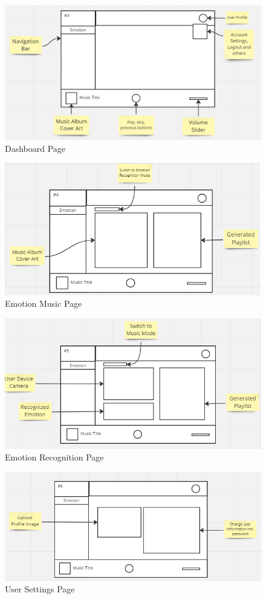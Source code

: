\begin{figure}[!ht]
    \centering
    \includegraphics[width=12cm]{Images/overview.png}
    \caption{Dashboard Page}
    \label{fig:dashboard}
\end{figure}
\begin{figure}[!ht]
    \centering
    \includegraphics[width=12cm]{Images/emotion.png}
    \caption{Emotion Music Page}
    \label{fig:emotion}
\end{figure}
\begin{figure}[!ht]
    \centering
    \includegraphics[width=12cm]{Images/detection.png}
    \caption{Emotion Recognition Page}
    \label{fig:emotion-recog}
\end{figure}
\begin{figure}[!ht]
    \centering
    \includegraphics[width=12cm]{Images/user-settings.png}
    \caption{User Settings Page}
    \label{fig:usr-settings}
\end{figure}
